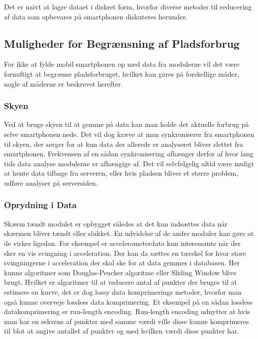 Det er naivt at lagre dataet i diskret form, hvorfor diverse metoder til reducering af data som opbevares på smartphonen diskuteres herunder.

\subsection{Muligheder for Begrænsning af Pladsforbrug}
For ikke at fylde mobil smartphonen op med data fra modulerne vil det være fornuftigt at begrænse pladsforbruget, hvilket kan gøres på forskellige måder, nogle af måderne er beskrevet herefter.

\subsubsection{Skyen}
Ved at bruge skyen til at gemme på data kan man holde det aktuelle forbrug på selve smartphonen nede.
Det vil dog kræve at man synkroniserer fra smartphonen til skyen, der sørger for at kun data der allerede er analyseret bliver slettet fra smartphonen. 
Frekvensen af en sådan synkronisering afhænger derfor af hvor lang tids data analyse modulerne er afhængige af.
Det vil selvfølgelig altid være muligt at hente data tilbage fra serveren, eller hvis pladsen bliver et større problem, udføre analyser på serversiden.

\subsubsection{Oprydning i Data}\label{sec:opryd}
Skærm tændt modulet er opbygget således at det kun indsættes data når skærmen bliver tændt eller slukket.
En udvidelse af de andre moduler kan gøre at de virker ligedan. 
For eksempel er accelerometerdata kun interessante når der sker en vis svingning i acceleration.
Der kan da sættes en tærskel for hvor store svingningerne i acceleration der skal ske for at data gemmes i databasen.
Her kunne algoritmer som Douglas-Peucker algoritme eller Sliding Window blive brugt.
Hvilket er algoritmer til at reducere antal af punkter der bruges til at estimere en kurve, det er dog lossy data komprimerings metoder, hvorfor man også kunne overveje lossless data komprimering.
Et eksempel på en sådan lossless datakomprimering er run-length encoding.
Run-length encoding udnytter at hvis man har en sekvens af punkter med samme værdi ville disse kunne komprimeres til blot at angive antallet af punkter og med hvilken værdi disse punkter har.

